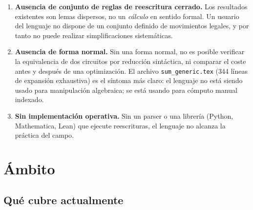 \documentclass[12pt, a4paper]{article}
\begin{document}
\begin{enumerate}
  \item \textbf{Ausencia de conjunto de reglas de reescritura cerrado.}
        Los resultados existentes son lemas dispersos, no un
        \emph{cálculo} en sentido formal. Un usuario del lenguaje no dispone
        de un conjunto definido de movimientos legales, y por tanto no puede
        realizar simplificaciones sistemáticas.

  \item \textbf{Ausencia de forma normal.}
        Sin una forma normal, no es posible verificar la equivalencia de dos
        circuitos por reducción sintáctica, ni comparar el coste antes y
        después de una optimización. El archivo \texttt{sum\_generic.tex}
        (344 líneas de expansión exhaustiva) es el síntoma más claro: el
        lenguaje no está siendo usado para manipulación algebraica; se está
        usando para cómputo manual indexado.

  \item \textbf{Sin implementación operativa.}
        Sin un parser o una librería (Python, Mathematica, Lean) que ejecute
        reescrituras, el lenguaje no alcanza la práctica del campo.
\end{enumerate}

\section{Ámbito}

\subsection{Qué cubre actualmente}
\end{document}

